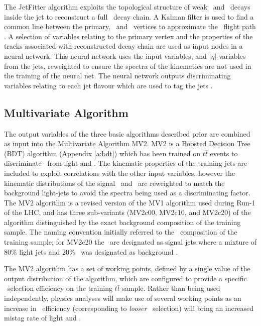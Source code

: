 		The JetFitter algorithm exploits the topological structure of weak \bhadron\ and \chadron\ decays inside the jet to reconstruct a full \bhadron\ decay chain. A Kalman filter is used to find a common line between the primary, \bhadron\ and \chadron\ vertices to approximate the \bhadron\ flight path \cite{jetfitter}. A selection of variables relating to the primary vertex and the properties of the tracks associated with reconstructed decay chain are used as input nodes in a neural network. This neural network uses the input variables, \pt and $|\eta|$ variables from the jets, reweighted to ensure the spectra of the kinematics are not used in the training of the neural net. The neural network outputs discriminating variables relating to each jet flavour which are used to tag the jets \cite{bTagPerformance}.

	\subsection{Multivariate Algorithm}
	\label{det:btag:mv}

	The output variables of the three basic algorithms described prior are combined as input into the Multivariate Algorithm MV2. MV2 is a Boosted Decision Tree (BDT) algorithm (Appendix \ref{a:bdt}) which has been trained on $t\bar{t}$ events to discriminate \bjets\ from light and \cjets. The kinematic properties of the training jets are included to exploit correlations with the other input variables, however the kinematic distributions of the signal \bjets\ and \cjets\ are reweighted to match the background light-jets to avoid the spectra being used as a discriminating factor. The MV2 algorithm is a revised version of the MV1 algorithm used during Run-1 of the LHC, and has three sub-variants (MV2c00, MV2c10, and MV2c20) of the algorithm distinguished by the exact background composition of the training sample. The naming convention initially referred to the \cjet\ composition of the training sample; for MV2c20 the \bjets\ are designated as signal jets where a mixture of 80\% light jets and 20\% \cjets\ was designated as background \cite{bTagExpPerf}.

	The MV2 algorithm has a set of working points, defined by a single value of the output distribution of the algorithm, which are configured to provide a specific \bjet\ selection efficiency on the training $t\bar{t}$ sample. Rather than being used independently, physics analyses will make use of several working points as an increase in \bjet\ efficiency (corresponding to \textit{looser} \bjet\ selection) will bring an increased mistag rate of light and \cjets.

